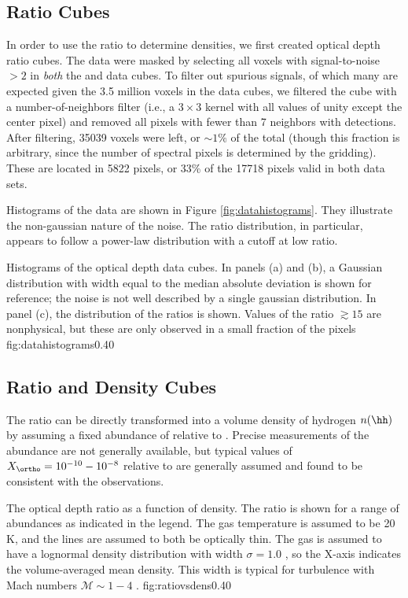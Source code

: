 \subsection{Ratio Cubes}
In order to use the \formaldehyde ratio to determine densities, we first
created optical depth ratio cubes.  The data were masked by selecting all
voxels with signal-to-noise $>2$ in  \emph{both} the \oneone and \twotwo data
cubes.  To filter out spurious signals, of which many are expected given the
3.5 million voxels in the data cubes, we filtered the cube with a
number-of-neighbors filter (i.e., a $3\times3$ kernel with all values of unity
except the center pixel) and removed all pixels with fewer than 7 neighbors
with detections.  After filtering, 35039 voxels were left, or $\sim 1\%$ of the
total (though this fraction is arbitrary, since the number of spectral pixels
is determined by the gridding).  These are located in 5822 pixels, or 33\% of
the 17718 pixels valid in both data sets.

Histograms of the data are shown in Figure \ref{fig:datahistograms}.  They
illustrate the non-gaussian nature of the noise.  The ratio distribution, in
particular, appears to follow a power-law distribution with a cutoff at low
ratio.

{Histograms of the optical depth data cubes.  In panels (a) and (b),
a Gaussian distribution with width equal to the median absolute deviation
is shown for reference; the noise is not well described by a single gaussian
distribution.  In panel (c), the distribution of the ratios is shown.
Values of the ratio $\gtrsim15$ are nonphysical, but these are only observed
in a small fraction of the pixels}
{fig:datahistograms}{0.4}{0}


\subsection{Ratio and Density Cubes}
\label{sec:ratiodenscubes}
The \formaldehyde ratio can be directly transformed into a volume density of
hydrogen $n(\hh)$ by assuming a fixed abundance of \formaldehyde relative to
\hh.  Precise measurements of the \formaldehyde abundance are not generally
available, but typical values of $X_{\ortho} = 10^{-10}-10^{-8}$ relative to
\hh are generally assumed \citep{Mangum1993a, Ginsburg2011a, Ginsburg2013a,
Ao2013a} and found to be consistent with the observations.

{The optical depth ratio as a function of \hh density.  The ratio is shown for
a range of \formaldehyde abundances as indicated in the legend.
The gas temperature is assumed to be 20 K, and the \formaldehyde lines
are assumed to both be optically thin.  The gas is assumed to have a
lognormal density distribution with width $\sigma=1.0$ \citep[see ][ for
details]{Ginsburg2013a}, so the X-axis indicates the volume-averaged
mean \hh density.  This width is typical for turbulence with Mach numbers
$\mathcal{M}\sim1-4$ \citep{Federrath2008a}.}
{fig:ratiovsdens}{0.4}{0}

